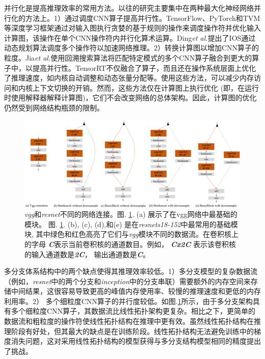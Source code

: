 并行化\cite{2020IOS,2018Optimizing,0OPTIMIZING}是提高推理效率的常用方法。以往的研究主要集中在两种最大化神经网络并行化的方法上。1）通过调度CNN算子提高并行性。TensorFlow\cite{2016TensorFlow}、PyTorch\cite{elmohamed}和TVM\cite{2018TVM}等深度学习框架通过对输入图执行贪婪的基于规则的操作来调度操作符并优化输入计算图，该操作在单个CNN操作符内并行化算术运算。Ding\textit{et al.}提出了IOS\cite{2020IOS}通过动态规划算法调度多个操作符以加速网络推理。2）转换计算图以增加CNN算子的粒度。Jia\textit{et al.}\cite{0OPTIMIZING}使用回溯搜索算法将匹配特定模式的多个CNN算子融合到更大的算子中，以提高并行性。TensorRT\cite{tensorRT}不仅融合了算子，而且还在操作系统层面上优化了推理速度，如内核自动调整和动态张量分配等。使用这些方法，可以减少内存访问和内核上下文切换的开销。然而，这些方法仅在计算图上执行优化 (即，在运行时使用解释器解释计算图)，它们不会改变网络的总体架构。因此，计算图的优化仍然受到网络结构瓶颈的限制。

\begin{figure}[!t]
	\centering
	
	\includegraphics[width=1\textwidth]{figures/Jresnet/FIG2_TII-21-2603.pdf}
	\caption{\emph{vgg}和\emph{resnet}不同的网络连接。图. \ref{dataFlow}. (a) 展示了在vgg网络中最基础的模块。 图. \ref{dataFlow}. (b), (c), (d),和(e) 是在\emph{resnets18-152}中最常用的基础模块, 其中绿色和红色高亮了它们与\emph{vgg}模块不同的数据流。在卷积核上的字母 \emph{\textbf{C}}表示当前卷积核的通道数目。例如， \emph{\textbf{Cx2C}} 表示该卷积核的输入通道数是\emph{\textbf{2C}}， 输出通道数是\emph{\textbf{C}}。}
	\label{dataFlow}
\end{figure}

多分支体系结构中的两个缺点使得其推理效率较低。1）多分支模型的复杂数据流（例如，\emph{resnet}中的两个分支和\emph{inception}中的分支串联）需要额外的内存空间来存储中间结果，这很容易导致更高的峰值内存使用率、较慢的推理速度和更低的内存利用率。2） 多个细粒度CNN算子的并行度较低。如图.\ref{dataFlow}所示，由于多分支架构具有多个细粒度CNN算子，其数据流比线性拓扑架构更复杂。相比之下，更简单的数据流和粗粒度的操作符使线性拓扑结构在推理中更有效。虽然线性拓扑结构在推理阶段有好处，但其最大的缺点是在训练阶段。线性拓扑结构无法避免训练中的梯度消失问题，这对采用线性拓扑结构的模型获得与多分支结构模型相同的精度提出了挑战。

